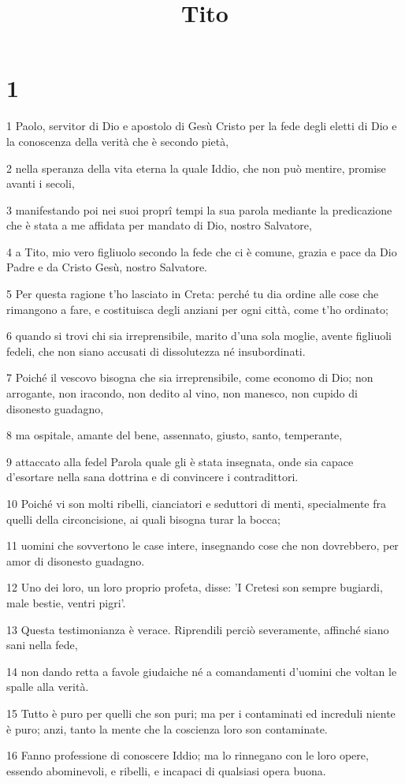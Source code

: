 

\title{Tito}


\chapter{1}

\par 1 Paolo, servitor di Dio e apostolo di Gesù Cristo per la fede degli eletti di Dio e la conoscenza della verità che è secondo pietà,
\par 2 nella speranza della vita eterna la quale Iddio, che non può mentire, promise avanti i secoli,
\par 3 manifestando poi nei suoi proprî tempi la sua parola mediante la predicazione che è stata a me affidata per mandato di Dio, nostro Salvatore,
\par 4 a Tito, mio vero figliuolo secondo la fede che ci è comune, grazia e pace da Dio Padre e da Cristo Gesù, nostro Salvatore.
\par 5 Per questa ragione t'ho lasciato in Creta: perché tu dia ordine alle cose che rimangono a fare, e costituisca degli anziani per ogni città, come t'ho ordinato;
\par 6 quando si trovi chi sia irreprensibile, marito d'una sola moglie, avente figliuoli fedeli, che non siano accusati di dissolutezza né insubordinati.
\par 7 Poiché il vescovo bisogna che sia irreprensibile, come economo di Dio; non arrogante, non iracondo, non dedito al vino, non manesco, non cupido di disonesto guadagno,
\par 8 ma ospitale, amante del bene, assennato, giusto, santo, temperante,
\par 9 attaccato alla fedel Parola quale gli è stata insegnata, onde sia capace d'esortare nella sana dottrina e di convincere i contradittori.
\par 10 Poiché vi son molti ribelli, cianciatori e seduttori di menti, specialmente fra quelli della circoncisione, ai quali bisogna turar la bocca;
\par 11 uomini che sovvertono le case intere, insegnando cose che non dovrebbero, per amor di disonesto guadagno.
\par 12 Uno dei loro, un loro proprio profeta, disse: 'I Cretesi son sempre bugiardi, male bestie, ventri pigri'.
\par 13 Questa testimonianza è verace. Riprendili perciò severamente, affinché siano sani nella fede,
\par 14 non dando retta a favole giudaiche né a comandamenti d'uomini che voltan le spalle alla verità.
\par 15 Tutto è puro per quelli che son puri; ma per i contaminati ed increduli niente è puro; anzi, tanto la mente che la coscienza loro son contaminate.
\par 16 Fanno professione di conoscere Iddio; ma lo rinnegano con le loro opere, essendo abominevoli, e ribelli, e incapaci di qualsiasi opera buona.

